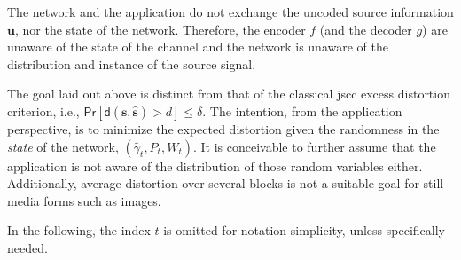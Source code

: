 \begin{remark}\label{rem:exchange}
The network and the application do not exchange the uncoded source information ${\mathbf{u}}$, nor the state of the network. Therefore, the encoder $f$ (and  the decoder $g$) are unaware of the state of the channel and the network is unaware of the distribution and instance of the source signal. 
\end{remark}



\begin{remark}
    The goal laid out above is distinct from that of the classical \gls{jscc} excess distortion criterion, i.e., $\mathsf{Pr}[\mathsf{d}({\mathbf{s}}, \hat{\mathbf{s}}) > d] \leq \delta$. The intention, from the application perspective, is to minimize the expected distortion given the randomness in the \emph{state} of the network, $(\tilde{\gamma_t},P_t,W_t)$. It is conceivable to further assume that the application is not aware of the distribution of those random variables either. Additionally, average distortion over several blocks is not a suitable goal for still media forms such as images. 
\end{remark}




In the following, the index $t$ is omitted for notation simplicity, unless specifically needed.


